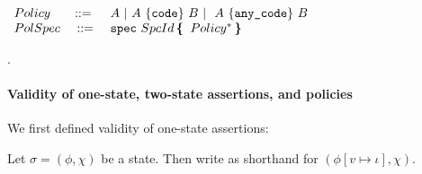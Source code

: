 \begin{definition}[Policies]
 $ ~ $ \\
 $
\begin{array}{lclcl}
Policy & \BBC & \ \A \ | \  \A \ \{ \prg{code} \}\  \B \ | \ \  \A \ \{ \prg{any\_code} \}\ \B
\\
PolSpec & \  \BBC  & \  \prg{spec}\ SpcId \, \lb\, Policy^*\, \rb
\end{array}
$
\end{definition}

.

\paragraph{Validity of one-state, two-state assertions, and policies} We first defined validity of one-state assertions:

 
Let $\sigma = (\phi,\chi)$ be a state. Then write
 as shorthand for
$(\phi[v{\mapsto}\iota],\chi)$.

